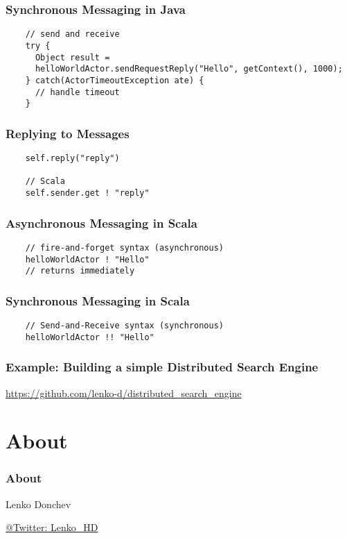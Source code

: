 \documentclass{beamer}
\begin{document}
\begin{frame}[fragile]
  \frametitle{Synchronous Messaging in Java}

  \begin{lstlisting}
    // send and receive
    try {
      Object result =
      helloWorldActor.sendRequestReply("Hello", getContext(), 1000);
    } catch(ActorTimeoutException ate) {
      // handle timeout
    }
  \end{lstlisting}
\end{frame}


\begin{frame}[fragile]
  \frametitle{Replying to Messages}

  \begin{lstlisting}
    self.reply("reply")

    // Scala
    self.sender.get ! "reply"

  \end{lstlisting}
\end{frame}



\begin{frame}[fragile]
  \frametitle{Asynchronous Messaging in Scala}

  \begin{lstlisting}
    // fire-and-forget syntax (asynchronous)
    helloWorldActor ! "Hello"
    // returns immediately

  \end{lstlisting}
\end{frame}


\begin{frame}[fragile]
  \frametitle{Synchronous Messaging in Scala}

  \begin{lstlisting}
    // Send-and-Receive syntax (synchronous)
    helloWorldActor !! "Hello"
  \end{lstlisting}
\end{frame}


\frame
{
  \frametitle{Example: Building a  simple Distributed Search Engine}
  \href{https://github.com/lenko-d/distributed\_search\_engine\_in\_akka}{https://github.com/lenko-d/distributed\_search\_engine}
}



\section{About}

\frame
{
	\frametitle{About}
        \begin{center}
        Lenko Donchev 
        \end{center}
        \begin{center}
        \href{http://twitter.com/Lenko\_HD}{ @Twitter: Lenko\_HD}
        \end{center}
}
\end{document}
